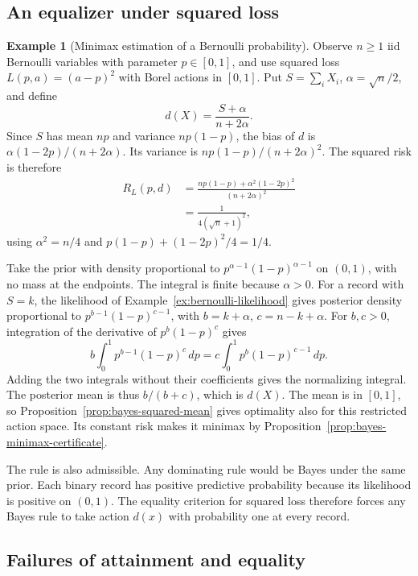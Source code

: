 \documentclass[11pt,oneside]{book}
\theoremstyle{definition}
\newtheorem{example}[theorem]{Example}
\theoremstyle{remark}
\begin{document}
\subsection{An equalizer under squared loss}
\label{subsec:bernoulli-minimax}

\begin{example}[Minimax estimation of a Bernoulli probability]
\label{ex:bernoulli-minimax}
Observe $n\geq1$ iid Bernoulli variables with parameter $p\in[0,1]$,
and use squared loss $L(p,a)=(a-p)^2$ with Borel actions in $[0,1]$.
Put $S=\sum_i X_i$, $\alpha=\sqrt n/2$, and define
\[
d(X)=\frac{S+\alpha}{n+2\alpha}.
\]
Since $S$ has mean $np$ and variance $np(1-p)$, the bias of $d$ is
$\alpha(1-2p)/(n+2\alpha)$. Its variance is $np(1-p)/(n+2\alpha)^2$.
The squared risk is therefore
\begin{align*}
R_L(p,d)
&=\frac{np(1-p)+\alpha^2(1-2p)^2}{(n+2\alpha)^2}\\
&=\frac{1}{4(\sqrt n+1)^2},
\end{align*}
using $\alpha^2=n/4$ and $p(1-p)+(1-2p)^2/4=1/4$.

Take the prior with density proportional to
$p^{\alpha-1}(1-p)^{\alpha-1}$ on $(0,1)$, with no mass at the endpoints.
The integral is finite because $\alpha>0$. For a record with $S=k$,
the likelihood of Example~\ref{ex:bernoulli-likelihood} gives posterior
density proportional to $p^{b-1}(1-p)^{c-1}$, with
$b=k+\alpha$, $c=n-k+\alpha$. For $b,c>0$, integration of the derivative
of $p^b(1-p)^c$ gives
\[
b\int_0^1 p^{b-1}(1-p)^c\,dp
=c\int_0^1 p^b(1-p)^{c-1}\,dp.
\]
Adding the two integrals without their coefficients gives the
normalizing integral. The posterior mean is thus $b/(b+c)$,
which is $d(X)$. The mean is in $[0,1]$, so
Proposition~\ref{prop:bayes-squared-mean} gives optimality also for
this restricted action space. Its constant risk makes it minimax
by Proposition~\ref{prop:bayes-minimax-certificate}.

The rule is also admissible. Any dominating rule would be Bayes
under the same prior. Each binary record has positive predictive
probability because its likelihood is positive on $(0,1)$.
The equality criterion for squared loss therefore forces any Bayes
rule to take action $d(x)$ with probability one at every record.
\end{example}

\subsection{Failures of attainment and equality}
\label{subsec:minimax-failures}
\end{document}
